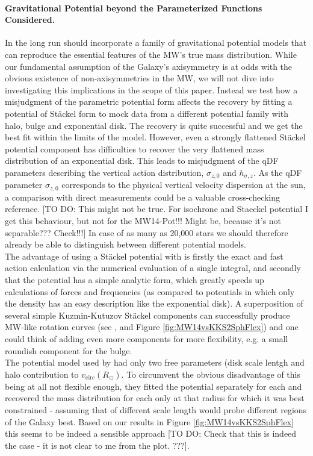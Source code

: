 \paragraph{Gravitational Potential beyond the Parameterized Functions Considered.}  In the long run \RM{} should incorporate a family of gravitational potential models that can reproduce the essential features of the MW's true mass distribution. While our fundamental assumption of the Galaxy's axisymmetry is at odds with the obvious existence of non-axisymmetries in the MW, we will not dive into investigating this implications in the scope of this paper. Instead we test how a misjudgment of the parametric potential form affects the recovery by fitting a potential of St\"{a}ckel form \citep{bat94} to mock data from a different potential family with halo, bulge and exponential disk. The recovery is quite successful and we get the best fit within the limits of the model. However, even a strongly flattened St\"{a}ckel potential component has difficulties to recover the very flattened mass distribution of an exponential disk. This leads to misjudgment of the qDF parameters describing the vertical action distribution, $\sigma_{z,0}$ and $h_{\sigma,z}$. As the qDF parameter $\sigma_{z,0}$ corresponds to the physical vertical velocity dispersion at the sun, a comparison with direct measurements could be a valuable cross-checking reference. [TO DO: This might not be true. For isochrone and Staeckel potential I get this behaviour, but not for the MW14-Pot!!! Might be, because it's not separable??? Check!!!] In case of as many as 20,000 stars we should therefore already be able to distinguish between different potential models.
\\The advantage of using a St\"{a}ckel potential with \RM{} is firstly the exact and fast action calculation via the numerical evaluation of a single integral, and secondly that the potential has a simple analytic form, which greatly speeds up calculations of forces and frequencies (as compared to potentials in which only the density has an easy description like the exponential disk). A superposition of several simple Kuzmin-Kutuzov St\"{a}ckel components can successfully produce MW-like rotation curves (see \citet{bat94}, \citet{2003MNRAS.340..752F} and Figure \ref{fig:MW14vsKKS2SphFlex}) and one could think of adding even more components for more flexibility, e.g. a small roundish component for the bulge.
\\The potential model used by \citet{bov13} had only two free parameters (disk scale lentgh and halo contribution to $v_\text{circ}(R_\odot)$. To circumvent the obvious disadvantage of this being at all not flexible enough, they fitted the potential separately for each \MAP{} and recovered the mass distribution for each \MAP{} only at that radius for which it was best constrained - assuming that \MAPs{} of different scale length would probe different regions of the Galaxy best. Based on our results in Figure \ref{fig:MW14vsKKS2SphFlex} this seems to be indeed a sensible approach [TO DO: Check that this is indeed the case - it is not clear to me from the plot. ???].
